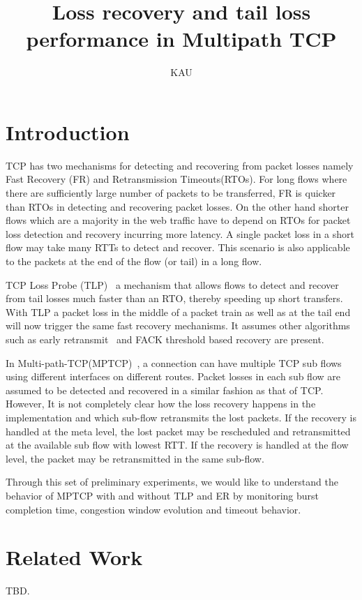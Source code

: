 \documentclass[10pt,draftcls,twocolumn]{IEEEconf}
\title{Loss recovery and tail loss performance in Multipath TCP}
\author{KAU}
\begin{document}
\maketitle

\begin{abstract}
\end{abstract}

\section{Introduction}
TCP has two mechanisms for detecting and recovering from packet losses namely Fast Recovery (FR) and Retransmission Timeouts(RTOs). For long flows where there are sufficiently large number of packets 
to be transferred, FR is quicker than RTOs in detecting and recovering packet losses. On the other hand shorter flows which are a majority in the web traffic have to depend on RTOs for packet loss detection 
and recovery incurring more latency. A single packet loss in a short flow may take many RTTs to detect and recover. This scenario is also applicable to the packets at the end of the flow (or tail) in a long 
flow.

TCP Loss Probe (TLP)~\cite{ietftlp} a mechanism that allows flows to detect and recover from tail losses much faster than an RTO, thereby speeding up short transfers. With TLP a packet loss in the middle 
of a packet train as well as at the tail end will now trigger the same fast recovery mechanisms. It assumes other algorithms such as early retransmit~\cite{rfc5827} and FACK threshold based recovery are 
present.

In Multi-path-TCP(MPTCP)~\cite{rfc6824}, a connection can have multiple TCP sub flows using different interfaces on different routes. Packet losses in each sub flow are assumed to be detected and recovered 
in a similar fashion as that of TCP. However, It is not completely clear how the loss recovery happens in the implementation and which sub-flow retransmits the lost packets. If the recovery is handled at the 
meta level, the lost packet may be rescheduled and retransmitted at the available sub flow with lowest RTT. If the recovery is handled at the flow level, the packet may be retransmitted in the same sub-flow. 

Through this set of preliminary experiments, we would like to understand the behavior of MPTCP with and without TLP and ER by monitoring burst completion time, congestion window evolution and timeout 
behavior.

\section{Related Work}\label{relwork}
TBD.
\end{document}
